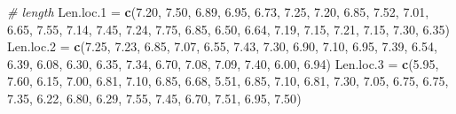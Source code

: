 \documentclass[
]{book}
\newenvironment{Shaded}{\begin{snugshade}}{\end{snugshade}}
\newcommand{\CommentTok}[1]{\textcolor[rgb]{0.56,0.35,0.01}{\textit{#1}}}
\newcommand{\FloatTok}[1]{\textcolor[rgb]{0.00,0.00,0.81}{#1}}
\newcommand{\FunctionTok}[1]{\textcolor[rgb]{0.13,0.29,0.53}{\textbf{#1}}}
\newcommand{\NormalTok}[1]{#1}
\newcommand{\OtherTok}[1]{\textcolor[rgb]{0.56,0.35,0.01}{#1}}
\begin{document}
\begin{Shaded}
\begin{Highlighting}[]
\CommentTok{\# length}
\NormalTok{Len.loc}\FloatTok{.1} \OtherTok{=} \FunctionTok{c}\NormalTok{(}\FloatTok{7.20}\NormalTok{, }\FloatTok{7.50}\NormalTok{, }\FloatTok{6.89}\NormalTok{, }\FloatTok{6.95}\NormalTok{, }\FloatTok{6.73}\NormalTok{, }\FloatTok{7.25}\NormalTok{, }\FloatTok{7.20}\NormalTok{, }\FloatTok{6.85}\NormalTok{, }\FloatTok{7.52}\NormalTok{, }\FloatTok{7.01}\NormalTok{, }\FloatTok{6.65}\NormalTok{, }
              \FloatTok{7.55}\NormalTok{, }\FloatTok{7.14}\NormalTok{, }\FloatTok{7.45}\NormalTok{, }\FloatTok{7.24}\NormalTok{, }\FloatTok{7.75}\NormalTok{, }\FloatTok{6.85}\NormalTok{, }\FloatTok{6.50}\NormalTok{, }\FloatTok{6.64}\NormalTok{, }\FloatTok{7.19}\NormalTok{, }\FloatTok{7.15}\NormalTok{, }\FloatTok{7.21}\NormalTok{, }
              \FloatTok{7.15}\NormalTok{, }\FloatTok{7.30}\NormalTok{, }\FloatTok{6.35}\NormalTok{)}
\NormalTok{Len.loc}\FloatTok{.2} \OtherTok{=} \FunctionTok{c}\NormalTok{(}\FloatTok{7.25}\NormalTok{, }\FloatTok{7.23}\NormalTok{, }\FloatTok{6.85}\NormalTok{, }\FloatTok{7.07}\NormalTok{, }\FloatTok{6.55}\NormalTok{, }\FloatTok{7.43}\NormalTok{, }\FloatTok{7.30}\NormalTok{, }\FloatTok{6.90}\NormalTok{, }\FloatTok{7.10}\NormalTok{, }\FloatTok{6.95}\NormalTok{, }\FloatTok{7.39}\NormalTok{, }
              \FloatTok{6.54}\NormalTok{, }\FloatTok{6.39}\NormalTok{, }\FloatTok{6.08}\NormalTok{, }\FloatTok{6.30}\NormalTok{, }\FloatTok{6.35}\NormalTok{, }\FloatTok{7.34}\NormalTok{, }\FloatTok{6.70}\NormalTok{, }\FloatTok{7.08}\NormalTok{, }\FloatTok{7.09}\NormalTok{, }\FloatTok{7.40}\NormalTok{, }\FloatTok{6.00}\NormalTok{, }
              \FloatTok{6.94}\NormalTok{)}
\NormalTok{Len.loc}\FloatTok{.3} \OtherTok{=} \FunctionTok{c}\NormalTok{(}\FloatTok{5.95}\NormalTok{, }\FloatTok{7.60}\NormalTok{, }\FloatTok{6.15}\NormalTok{, }\FloatTok{7.00}\NormalTok{, }\FloatTok{6.81}\NormalTok{, }\FloatTok{7.10}\NormalTok{, }\FloatTok{6.85}\NormalTok{, }\FloatTok{6.68}\NormalTok{, }\FloatTok{5.51}\NormalTok{, }\FloatTok{6.85}\NormalTok{, }\FloatTok{7.10}\NormalTok{, }
              \FloatTok{6.81}\NormalTok{, }\FloatTok{7.30}\NormalTok{, }\FloatTok{7.05}\NormalTok{, }\FloatTok{6.75}\NormalTok{, }\FloatTok{6.75}\NormalTok{, }\FloatTok{7.35}\NormalTok{, }\FloatTok{6.22}\NormalTok{, }\FloatTok{6.80}\NormalTok{, }\FloatTok{6.29}\NormalTok{, }\FloatTok{7.55}\NormalTok{, }\FloatTok{7.45}\NormalTok{, }
              \FloatTok{6.70}\NormalTok{, }\FloatTok{7.51}\NormalTok{, }\FloatTok{6.95}\NormalTok{, }\FloatTok{7.50}\NormalTok{)}


\end{Highlighting}
\end{Shaded}
\end{document}
